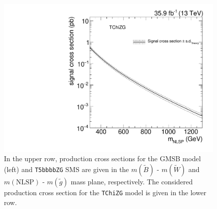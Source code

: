 \begin{figure}
 \includegraphics[width=\pairwidth]{figures/acceptance/TChiNG_XSECGRAPH}
 \caption{In the upper row, production cross sections for the GMSB model (left) and \texttt{T5bbbbZG} SMS are given in the $m(\widetilde{B})$ - $m(\widetilde{W})$ and $m(\mathrm{NLSP})$ - $m(\tilde{g})$ mass plane, respectively. The considered production cross section for the \texttt{TChiZG} model is given in the lower row.}
 \label{fig:app_xsec}
\end{figure}
\FloatBarrier

